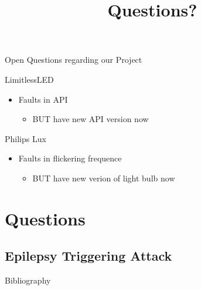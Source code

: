 \documentclass[11pt,t,usepdftitle=false,aspectratio=169]{beamer}
\begin{document}
\begin{frame}{Open Questions regarding our Project} %
    \begin{block}{LimitlessLED}
        \begin{itemize}
            \item Faults in API %
            \begin{itemize}
                \item BUT have new API version now
            \end{itemize}
        \end{itemize}
    \end{block}
    
    \begin{block}{Philips Lux}
        \begin{itemize}
            \item Faults in flickering frequence  %
            \begin{itemize}
                \item BUT have new verion of light bulb now
            \end{itemize}
        \end{itemize}
    \end{block}
\end{frame}


\title{Questions?}
\subtitle{}
\section{Questions}


\appendix
\subsection{Epilepsy Triggering Attack}%
\label{sub:epilepsy_triggering_attack}

\begin{frame}[allowframebreaks]{Bibliography}
	
	
\end{frame}
\end{document}
